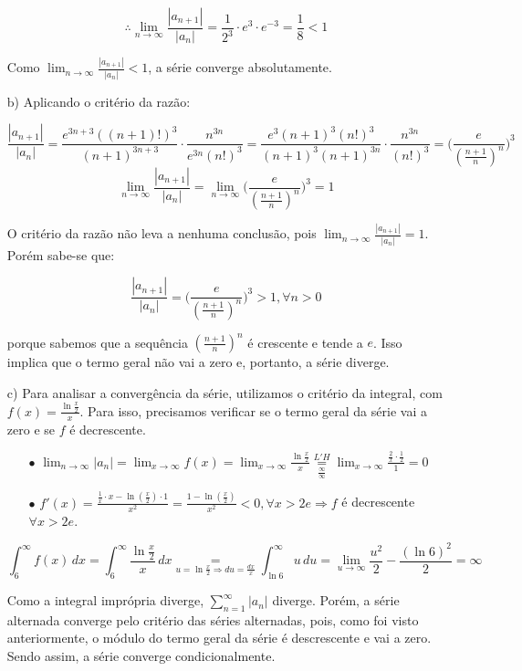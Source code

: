 \documentclass[12pt,a4paper]{article}
\begin{document}
\begin{itemize}
$$\therefore \lim_{n\rightarrow\infty} \frac{|a_{n+1}|}{|a_n|} = \frac{1}{2^3} \cdot e^3 \cdot e^{-3} = \frac{1}{8} < 1 $$

Como $\displaystyle\lim_{n\rightarrow\infty} \frac{|a_{n+1}|}{|a_n|} < 1$, a série converge absolutamente.

\item[b)] Aplicando o critério da razão:

$$ \frac{|a_{n+1}|}{|a_n|} =  \frac{e^{3n+3}((n+1)!)^3}{(n+1)^{3n+3}} \cdot  \frac{n^{3n}}{e^{3n} (n!)^3} =  \frac{e^{3}(n+1)^3 (n!)^3}{(n+1)^{3} (n+1)^{3n}} \cdot  \frac{n^{3n}}{ (n!)^3} = \Bigg( \frac{e}{(\frac{n+1}{n})^n} \Bigg)^3 $$
$$\lim_{n\rightarrow\infty} \frac{|a_{n+1}|}{|a_n|} = \lim_{n\rightarrow\infty} \Bigg( \frac{e}{(\frac{n+1}{n})^n} \Bigg)^3 = 1 $$

O critério da razão não leva a nenhuma conclusão, pois $\displaystyle\lim_{n\rightarrow\infty} \frac{|a_{n+1}|}{|a_n|} = 1 $. Porém sabe-se que:

$$ \frac{|a_{n+1}|}{|a_n|} = \Bigg( \frac{e}{(\frac{n+1}{n})^n} \Bigg)^3 > 1, \forall n > 0 $$

porque sabemos que a sequência $(\frac{n+1}{n})^n$ é crescente e tende a $e$. Isso implica que o termo geral não vai a zero e, portanto, a série diverge.

\item[c)] Para analisar a convergência da série, utilizamos o critério da integral, com $f(x) = \frac{\ln \frac{x}{2}}{x}$. Para isso, precisamos verificar se o termo geral da série vai a zero e se $f$ é decrescente.
    
    \begin{itemize}
    \item[$\bullet$] $\displaystyle\lim_{n \rightarrow \infty} |a_n| = \lim_{x \rightarrow \infty} f(x) = \lim_{x \rightarrow \infty} \frac{\ln \frac{x}{2}}{x} \underset{\frac{\infty}{\infty}}{ \overset{L'H}{=}} \lim_{x \rightarrow \infty} \frac{\frac{2}{x} \cdot \frac{1}{2}}{1} = 0$
    \item[$\bullet$] $f'(x) = \frac{\frac{1}{x} \cdot x - \ln(\frac{x}{2}) \cdot 1}{x^2} = \frac{1 - \ln(\frac{x}{2})}{x^2} < 0, \forall x > 2e  \Rightarrow f$ é decrescente $\forall x > 2e$.
    \end{itemize}
    
    $$ \int_{6}^\infty f(x) \, dx = \int_{6}^\infty \frac{\ln \frac{x}{2}}{x}  \, dx \underset{u = \ln \frac{x}{2} \Rightarrow du = \frac{dx}{x} }{=} \int_{\ln 6}^\infty u  \, du = \lim_{u\rightarrow\infty} \frac{u^2}{2} - \frac{(\ln 6)^2}{2} = \infty $$
    
    Como a integral imprópria diverge, $\displaystyle\sum_{n=1}^\infty |a_n|$ diverge. Porém, a série alternada converge pelo critério das séries alternadas, pois, como foi visto anteriormente, o módulo do termo geral da série é descrescente e vai a zero. Sendo assim, a série converge condicionalmente.

\end{itemize}
\end{document}
